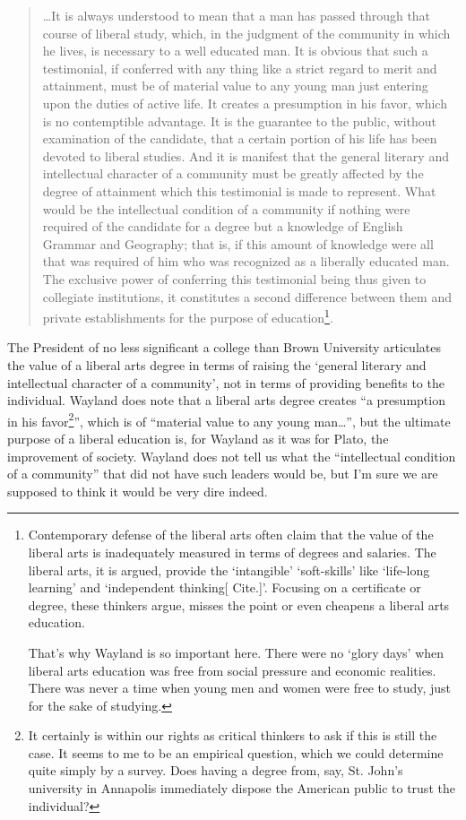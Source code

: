 \begin{quote}

{\ldots}It is always understood to mean that a man has passed through that course of liberal study, which, in the judgment of the community in which he lives, is necessary to a well educated man. It is obvious that such a testimonial, if conferred with any thing like a strict regard to merit and attainment, must be of material value to any young man just entering upon the duties of active life. It creates a presumption in his favor, which is no contemptible advantage. It is the guarantee to the public, without examination of the candidate, that a certain portion of his life has been devoted to liberal studies. And it is manifest that the general literary and intellectual character of a community must be greatly affected by the degree of attainment which this testimonial is made to represent. What would be the intellectual condition of a community if nothing were required of the candidate for a degree but a knowledge of English Grammar and Geography; that is, if this amount of knowledge were all that was required of him who was recognized as a liberally educated man. The exclusive power of conferring this testimonial being thus given to collegiate institutions, it constitutes a second difference between them and private establishments for the purpose of education\footnote{Contemporary defense of the liberal arts often claim that the value of the liberal arts is inadequately measured in terms of degrees and salaries. The liberal arts, it is argued, provide the `intangible' `soft-skills' like `life-long learning' and `independent thinking[ Cite.]'. Focusing on a certificate or degree, these thinkers argue, misses the point or even cheapens a liberal arts education.

That's why Wayland is so important here. There were no `glory days' when liberal arts education was free from social pressure and economic realities. There was never a time when young men and women were free to study, just for the sake of studying.}. ~\citep[p. 45--46]{Wayland:1842tw}
\end{quote}

The President of no less significant a college than Brown University articulates the value of a liberal arts degree in terms of raising the `general literary and intellectual character of a community', not in terms of providing benefits to the individual. Wayland does note that a liberal arts degree creates ``a presumption in his favor\footnote{It certainly is within our rights as critical thinkers to ask if this is still the case. It seems to me to be an empirical question, which we could determine quite simply by a survey. Does having a degree from, say, St. John's university in Annapolis immediately dispose the American public to trust the individual?}'', which is of ``material value to any young man{\ldots}'', but the ultimate purpose of a liberal education is, for Wayland as it was for Plato, the improvement of society. Wayland does not tell us what the ``intellectual condition of a community'' that did not have such leaders would be, but I'm sure we are supposed to think it would be very dire indeed. 

